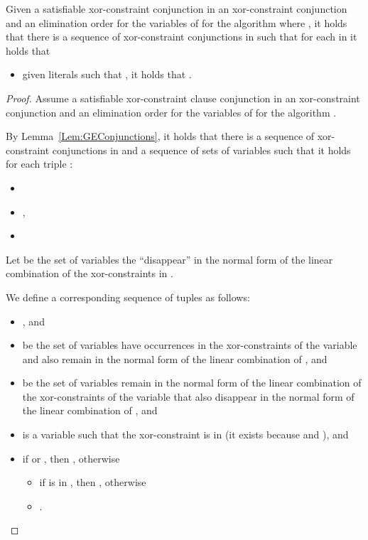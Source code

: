 \begin{lemma}
\label{Lem:GEPropagation}
Given a satisfiable xor-constraint conjunction  in an
xor-constraint conjunction  and an elimination
order
 for the variables of  for the algorithm
 where , it holds that there is a sequence of xor-constraint conjunctions  in 
such that for each  in  it holds that
\begin{itemize}
\item given literals  such that , it holds that
    .
\end{itemize}
\end{lemma}

\begin{proof}
Assume a satisfiable xor-constraint clause conjunction  in an
xor-constraint conjunction  and an elimination
order  for the variables of 
for the algorithm .

By Lemma~\ref{Lem:GEConjunctions}, it holds that
there is a sequence of xor-constraint conjunctions  in  and a sequence of sets of variables
 such that
it holds for each triple :
\begin{itemize}
\item 
\item ,
\item 
\end{itemize}

Let  be the set of variables the ``disappear'' in the
normal form of the linear combination of the xor-constraints in .

We define a corresponding sequence of  tuples  as follows:
\begin{itemize}
\item 
, and
\item 
be the set of variables have occurrences in the xor-constraints of the variable 
and also remain in the normal form of the linear combination of , and
\item 
be the set of variables remain in the normal form of the linear combination of the xor-constraints of the variable  that also disappear in the normal form of the linear combination of , and
\item  is a variable such that the xor-constraint  is in  (it exists because  and ), and
\item if  or , then , otherwise
\begin{itemize}
\item if  is in ,
    then , otherwise
\item 
.
\end{itemize}
\end{itemize}


\end{proof}
